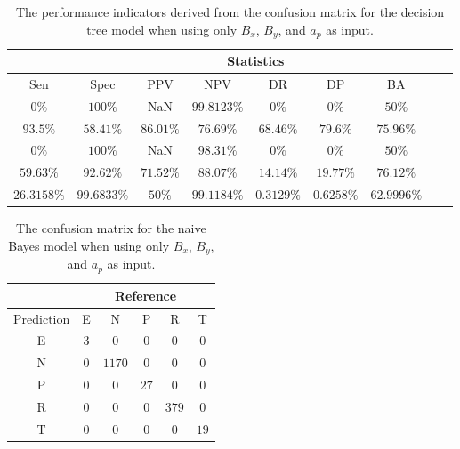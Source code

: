 \begin{table}[!ht]
	\centering
	\begin{tabular}{|c|c|c|c|c|c|c|c|c|}
		\hline
		 & \multicolumn{7}{c|}{Statistics} \\ \hline
		Sen & Spec & PPV & NPV & DR & DP & BA \\ \hline
		$0\%$ & $100\%$ & NaN & $99.8123\%$ & $0\%$ & $0\%$ & $50\%$ \\ \hline
		$93.5\%$ & $58.41\%$ & $86.01\%$ & $76.69\%$ & $68.46\%$ & $79.6\%$ & $75.96\%$ \\ \hline
		$0\%$ & $100\%$ & NaN & $98.31\%$ & $0\%$ & $0\%$ & $50\%$ \\ \hline
		$59.63\%$ & $92.62\%$ & $71.52\%$ & $88.07\%$ & $14.14\%$ & $19.77\%$ & $76.12\%$ \\ \hline
		$26.3158\%$ & $99.6833\%$ & $50\%$ & $99.1184\%$ & $0.3129\%$ & $0.6258\%$ & $62.9996\%$ \\ \hline
	\end{tabular}
	\caption{The performance indicators derived from the confusion matrix for the decision tree model when using only $B_{x}$, $B_{y}$, and $a_{p}$ as input.}
	\label{tab:cs:xyap:C5.0}
\end{table}

\begin{table}[!ht]
	\centering
	\begin{tabular}{|c|c|c|c|c|c|}
		\hline
		 & \multicolumn{5}{|c|}{Reference} \\ \hline
		 Prediction & E & N & P & R & T \\ \hline
		 E & $3$ & $0$ & $0$ & $0$ & $0$ \\ \hline
		 N & $0$ & $1170$ & $0$ & $0$ & $0$ \\ \hline
		 P & $0$ & $0$ & $27$ & $0$ & $0$ \\ \hline
		 R & $0$ & $0$ & $0$ & $379$ & $0$ \\ \hline
		 T & $0$ & $0$ & $0$ & $0$ & $19$ \\ \hline
	\end{tabular}
	\caption{The confusion matrix for the naive Bayes model when using only $B_{x}$, $B_{y}$, and $a_{p}$ as input.}
	\label{tab:cm:xyap:nb}
\end{table}

